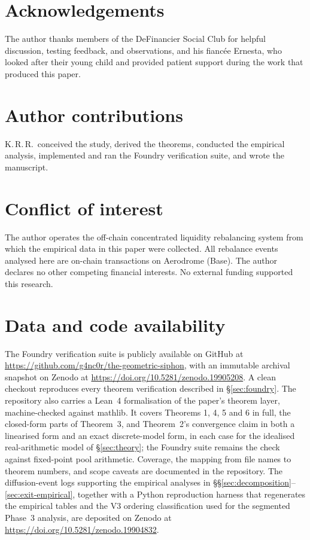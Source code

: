 \documentclass{manuscript}
\begin{document}
\backmatternotes

\section*{Acknowledgements}

The author thanks members of the DeFinancier Social Club for helpful discussion, testing feedback, and observations, and his fianc\'ee Ernesta, who looked after their young child and provided patient support during the work that produced this paper.

\section*{Author contributions}

K.\,R.\,R.\ conceived the study, derived the theorems, conducted the empirical analysis, implemented and ran the Foundry verification suite, and wrote the manuscript.

\section*{Conflict of interest}

The author operates the off-chain concentrated liquidity rebalancing system from which the empirical data in this paper were collected. All rebalance events analysed here are on-chain transactions on Aerodrome (Base). The author declares no other competing financial interests. No external funding supported this research.

\section*{Data and code availability}

The Foundry verification suite is publicly available on GitHub at \url{https://github.com/g4nc0r/the-geometric-siphon}, with an immutable archival snapshot on Zenodo at \url{https://doi.org/10.5281/zenodo.19905208}. A clean checkout reproduces every theorem verification described in \S\ref{sec:foundry}. The repository also carries a Lean~4 formalisation of the paper's theorem layer, machine-checked against mathlib. It covers Theorems 1, 4, 5 and 6 in full, the closed-form parts of Theorem~3, and Theorem~2's convergence claim in both a linearised form and an exact discrete-model form, in each case for the idealised real-arithmetic model of \S\ref{sec:theory}; the Foundry suite remains the check against fixed-point pool arithmetic. Coverage, the mapping from file names to theorem numbers, and scope caveats are documented in the repository. The diffusion-event logs supporting the empirical analyses in \S\S\ref{sec:decomposition}--\ref{sec:exit-empirical}, together with a Python reproduction harness that regenerates the empirical tables and the V3 ordering classification used for the segmented Phase~3 analysis, are deposited on Zenodo at \url{https://doi.org/10.5281/zenodo.19904832}.
\end{document}
